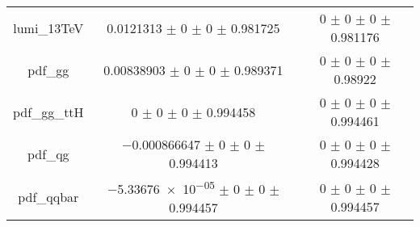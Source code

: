 \begin{table}
\begin{tabular}{ccc}
lumi\_13TeV & \num{0.0121313} $\pm$ \num{0} $\pm$ \num{0} $\pm$ \num{0.981725} & \num{0} $\pm$ \num{0} $\pm$ \num{0} $\pm$ \num{0.981176}\\
pdf\_gg & \num{0.00838903} $\pm$ \num{0} $\pm$ \num{0} $\pm$ \num{0.989371} & \num{0} $\pm$ \num{0} $\pm$ \num{0} $\pm$ \num{0.98922}\\
pdf\_gg\_ttH & \num{0} $\pm$ \num{0} $\pm$ \num{0} $\pm$ \num{0.994458} & \num{0} $\pm$ \num{0} $\pm$ \num{0} $\pm$ \num{0.994461}\\
pdf\_qg & \num{-0.000866647} $\pm$ \num{0} $\pm$ \num{0} $\pm$ \num{0.994413} & \num{0} $\pm$ \num{0} $\pm$ \num{0} $\pm$ \num{0.994428}\\
pdf\_qqbar & \num{-5.33676e-05} $\pm$ \num{0} $\pm$ \num{0} $\pm$ \num{0.994457} & \num{0} $\pm$ \num{0} $\pm$ \num{0} $\pm$ \num{0.994457}\\
\bottomrule
\end{tabular}
\end{table}